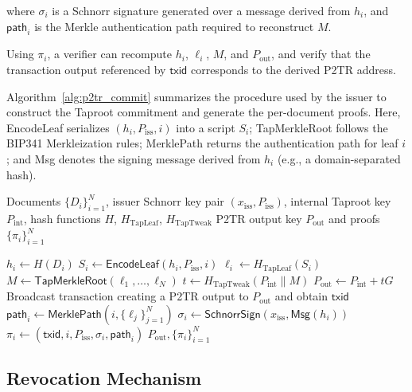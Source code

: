 \documentclass{ieeeaccess}
\begin{document}
where $\sigma_i$ is a Schnorr signature generated over a message derived from $h_i$, and $\mathsf{path}_i$ is the Merkle authentication path required to reconstruct $M$.

Using $\pi_i$, a verifier can recompute $h_i$, $\ell_i$, $M$, and $P_{\mathrm{out}}$, and verify that the transaction output referenced by $\mathsf{txid}$ corresponds to the derived P2TR address.


Algorithm~\ref{alg:p2tr_commit} summarizes the procedure used by the issuer to construct the Taproot commitment and generate the per-document proofs.
Here, \textsf{EncodeLeaf} serializes $(h_i, P_{\mathrm{iss}}, i)$ into a script $S_i$; \textsf{TapMerkleRoot} follows the BIP341 Merkleization rules; \textsf{MerklePath} returns the authentication path for leaf $i$; and \textsf{Msg} denotes the signing message derived from $h_i$ (e.g., a domain-separated hash).

\begin{algorithm}[t]
\caption{Batch commitment and P2TR anchoring for $N$ documents}
\label{alg:p2tr_commit}
\begin{algorithmic}[1]
\REQUIRE Documents $\{D_i\}_{i=1}^{N}$, issuer Schnorr key pair $(x_{\mathrm{iss}}, P_{\mathrm{iss}})$, internal Taproot key $P_{\mathrm{int}}$, hash functions $H$, $H_{\text{TapLeaf}}$, $H_{\text{TapTweak}}$
\ENSURE P2TR output key $P_{\mathrm{out}}$ and proofs $\{\pi_i\}_{i=1}^{N}$

    \STATE $h_i \leftarrow H(D_i)$
    \STATE $S_i \leftarrow \textsf{EncodeLeaf}(h_i, P_{\mathrm{iss}}, i)$
    \STATE $\ell_i \leftarrow H_{\text{TapLeaf}}(S_i)$
\ENDFOR
\STATE $M \leftarrow \textsf{TapMerkleRoot}(\ell_1,\ldots,\ell_N)$
\STATE $t \leftarrow H_{\text{TapTweak}}(P_{\mathrm{int}} \parallel M)$
\STATE $P_{\mathrm{out}} \leftarrow P_{\mathrm{int}} + tG$
\STATE Broadcast transaction creating a P2TR output to $P_{\mathrm{out}}$ and obtain $\mathsf{txid}$
    \STATE $\mathsf{path}_i \leftarrow \textsf{MerklePath}(i, \{\ell_j\}_{j=1}^{N})$
    \STATE $\sigma_i \leftarrow \textsf{SchnorrSign}(x_{\mathrm{iss}}, \textsf{Msg}(h_i))$
    \STATE $\pi_i \leftarrow (\mathsf{txid}, i, P_{\mathrm{iss}}, \sigma_i, \mathsf{path}_i)$
\ENDFOR
\RETURN $P_{\mathrm{out}}, \{\pi_i\}_{i=1}^{N}$
\end{algorithmic}
\end{algorithm}


\subsection{Revocation Mechanism}
\end{document}
